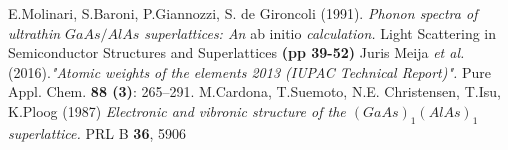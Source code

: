 \documentclass{article}
\begin{document}
\appendix
\newpage
\begin{thebibliography}{9}
		E.Molinari, S.Baroni, P.Giannozzi, S. de Gironcoli (1991).
		\emph{Phonon spectra of ultrathin $GaAs/AlAs$ superlattices: An} ab initio \emph{calculation.} {\color{Burgundy} Light Scattering in Semiconductor Structures and Superlattices \textbf{(pp 39-52)}}
		Juris Meija \emph{et al.} (2016).\emph{"Atomic weights of the elements 2013 (IUPAC Technical Report)".} {\color{Burgundy} Pure Appl. Chem. \textbf{88 (3)}: 265–291.}
		M.Cardona, T.Suemoto, N.E. Christensen, T.Isu, K.Ploog (1987)
		\emph{Electronic and vibronic structure of the $(GaAs)_1(AlAs)_1$ superlattice.} {\color{Burgundy} PRL B \textbf{36}, 5906}
\end{thebibliography}
\end{document}
